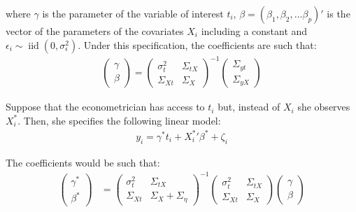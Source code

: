 \documentclass[10pt]{article}
\def\b{\beta}
\def\g{\gamma}
\begin{document}
        where $\g$ is the parameter of the variable of interest $t_i$, $\b=(\b_1,\b_2,\dots \b_p)'$ is the vector of the parameters of the covariates $X_i$ including a constant and $\epsilon_i \sim \operatorname{iid}(0,\sigma^2_\epsilon)$. Under this specification, the coefficients are such that:
        \begin{align} \label{true_coeffs}
            \left(\begin{array}{l}
        {\gamma} \\
        {\beta}
        \end{array}\right)=\left(\begin{array}{cc}
        {\sigma}^2_{t} & \Sigma_{tX} \\
        \Sigma_{Xt} & {\Sigma}_{X}
        \end{array}\right)^{-1}\left(\begin{array}{c}
        \Sigma_{yt} \\
        \Sigma_{yX}
        \end{array}\right)
        \end{align}
        
        Suppose that the econometrician has access to $t_i$ but, instead of $X_i$ she observes $X^*_i$. Then, she specifies the following linear model:
        \begin{align}
            y_i = \gamma^* t_i + {X^{*}_i}' \beta^* + \zeta_i
        \end{align}
        
        The coefficients would be such that:
        \begin{align} \label{mismeasured_coeffs}
            \left(\begin{array}{l}
        {\gamma}^* \\
        {\beta}^*
        \end{array}\right)
        & =\left(\begin{array}{cc}
        {\sigma}^2_{t} & \Sigma_{tX} \\
        \Sigma_{Xt} & {\Sigma}_{X}+{\Sigma}_{\eta}
        \end{array}\right)^{-1}\left(\begin{array}{cc}
        {\sigma}^2_{t} & \Sigma_{tX} \\
        \Sigma_{Xt} & {\Sigma}_{X}
        \end{array}\right)\left(\begin{array}{l}
        {\gamma} \\
        {\beta}
        \end{array}\right)
        \end{align}
        
\end{document}
